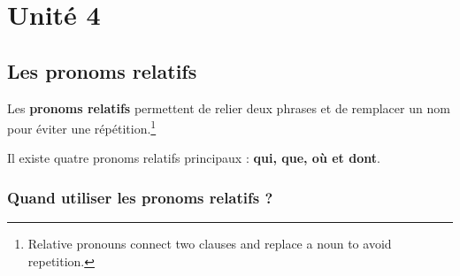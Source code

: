 \documentclass[math,code]{amznotes}
\theoremstyle{remark}
\begin{document}
\chapter{Unité 4}

\section{Les pronoms relatifs}

Les \textbf{pronoms relatifs} permettent de relier deux phrases et de remplacer un nom pour éviter une répétition.\footnote{Relative pronouns connect two clauses and replace a noun to avoid repetition.}

Il existe quatre pronoms relatifs principaux : \textbf{qui, que, où et dont}.

\subsection*{Quand utiliser les pronoms relatifs ?}
\end{document}
